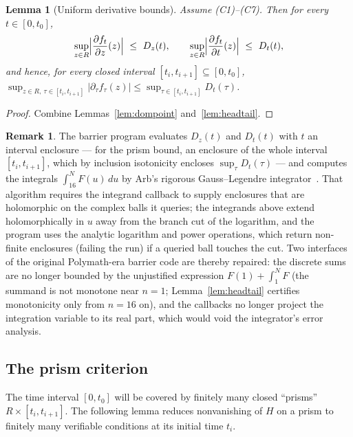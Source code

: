 \documentclass[11pt]{article}
\newtheorem{lemma}[theorem]{Lemma}
\theoremstyle{definition}
\newtheorem{remark}[theorem]{Remark}
\begin{document}
\begin{lemma}[Uniform derivative bounds]\label{lem:derivbox}
Assume (C1)--(C7). Then for every $t\in[0,t_0]$,
\[
\sup_{z\in R}\Bigl|\frac{\partial f_t}{\partial z}(z)\Bigr|
\ \le\ D_z(t),
\qquad
\sup_{z\in R}\Bigl|\frac{\partial f_t}{\partial t}(z)\Bigr|
\ \le\ D_t(t),
\]
and hence, for every closed interval
$[t_i,t_{i+1}]\subseteq[0,t_0]$,
$\sup_{z\in R,\ \tau\in[t_i,t_{i+1}]}|\partial_\tau f_\tau(z)|
\le\sup_{\tau\in[t_i,t_{i+1}]}D_t(\tau)$.
\end{lemma}

\begin{proof}
Combine Lemmas~\ref{lem:dompoint} and~\ref{lem:headtail}.
\end{proof}

\begin{remark}\label{rem:quadrature}
The barrier program evaluates $D_z(t)$ and $D_t(t)$ with $t$ an
interval enclosure --- for the prism bound, an enclosure of the
whole interval $[t_i,t_{i+1}]$, which by inclusion isotonicity
encloses $\sup_\tau D_t(\tau)$ --- and computes the integrals
$\int_{16}^NF(u)\,du$ by Arb's rigorous Gauss--Legendre
integrator~\cite{JohanssonIntegration}. That algorithm requires the
integrand callback to supply enclosures that are holomorphic on the
complex balls it queries; the integrands above extend
holomorphically in $u$ away from the branch cut of the logarithm,
and the program uses the analytic logarithm and power operations,
which return non-finite enclosures (failing the run) if a queried
ball touches the cut. Two interfaces of the original Polymath-era
barrier code are thereby repaired: the discrete sums are no longer
bounded by the unjustified expression $F(1)+\int_1^NF$ (the summand
is not monotone near $n=1$; Lemma~\ref{lem:headtail} certifies
monotonicity only from $n=16$ on), and the callbacks no longer
project the integration variable to its real part, which would void
the integrator's error analysis.
\end{remark}

\subsection{The prism criterion}\label{sec:prism}

The time interval $[0,t_0]$ will be covered by finitely many closed
``prisms'' $R\times[t_i,t_{i+1}]$. The following lemma reduces
nonvanishing of $H$ on a prism to finitely many verifiable
conditions at its initial time $t_i$.
\end{document}
